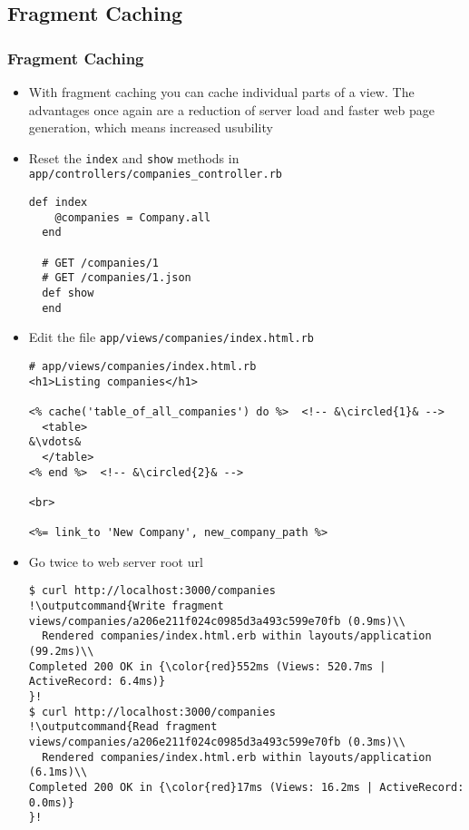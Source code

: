 \documentclass{beamer}
\newcommand*\circled[1]{\tikz[baseline=(char.base)]{
            \node[shape=circle,draw,inner sep=2pt] (char) {#1};}}
\newcommand{\outputcommand}[1]{\color{darkgreen}{#1}}
\begin{document}
\subsection{Fragment Caching}
\begin{frame}
\frametitle{Fragment Caching}
\begin{itemize}
\item With fragment caching you can cache individual parts of a view. The advantages once again are a reduction of server load and faster web page generation, which means increased usubility

\item Reset the \texttt{index} and \texttt{show} methods in \texttt{app/controllers/companies\_controller.rb}
\lstset{language=Ruby, style=eclipse}
\begin{lstlisting}[escapechar=&]
def index
    @companies = Company.all
  end

  # GET /companies/1
  # GET /companies/1.json
  def show
  end
\end{lstlisting}

\item Edit the file \texttt{app/views/companies/index.html.rb}
\lstset{language=Ruby, style=eclipse}
\begin{lstlisting}[escapechar=&]
# app/views/companies/index.html.rb
<h1>Listing companies</h1>

<% cache('table_of_all_companies') do %>  <!-- &\circled{1}& -->
  <table>
&\vdots&
  </table>
<% end %>  <!-- &\circled{2}& -->

<br>

<%= link_to 'New Company', new_company_path %>
\end{lstlisting}

\item Go twice to web server root url
\lstset{language=shell}
\begin{lstlisting}[escapechar=!]
$ curl http://localhost:3000/companies
!\outputcommand{Write fragment views/companies/a206e211f024c0985d3a493c599e70fb (0.9ms)\\
  Rendered companies/index.html.erb within layouts/application (99.2ms)\\
Completed 200 OK in {\color{red}552ms (Views: 520.7ms | ActiveRecord: 6.4ms)}
}!
$ curl http://localhost:3000/companies
!\outputcommand{Read fragment views/companies/a206e211f024c0985d3a493c599e70fb (0.3ms)\\
  Rendered companies/index.html.erb within layouts/application (6.1ms)\\
Completed 200 OK in {\color{red}17ms (Views: 16.2ms | ActiveRecord: 0.0ms)}
}!
\end{lstlisting}


\end{itemize}
\end{frame}
\end{document}
